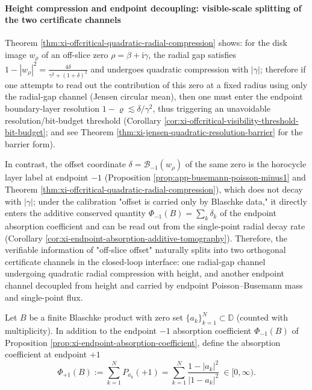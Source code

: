 \paragraph{Height compression and endpoint decoupling: visible-scale splitting of the two certificate channels}
Theorem \ref{thm:xi-offcritical-quadratic-radial-compression} shows: for the disk image \(w_\rho\) of an off-slice zero \(\rho=\beta+\mathrm{i}\gamma\), the radial gap satisfies
\(
1-|w_\rho|^2=\frac{4\delta}{\gamma^2+(1+\delta)^2}
\)
and undergoes quadratic compression with \(|\gamma|\);
therefore if one attempts to read out the contribution of this zero at a fixed radius using only the radial-gap channel (Jensen circular mean), then one must enter the endpoint boundary-layer resolution \(1-\varrho\lesssim \delta/\gamma^2\), thus triggering an unavoidable resolution/bit-budget threshold (Corollary \ref{cor:xi-offcritical-visibility-threshold-bit-budget}; and see Theorem \ref{thm:xi-jensen-quadratic-resolution-barrier} for the barrier form).
\par
In contrast, the offset coordinate \(\delta=\mathcal{B}_{-1}(w_\rho)\) of the same zero is the horocycle layer label at endpoint \(-1\) (Proposition \ref{prop:app-busemann-poisson-minus1} and Theorem \ref{thm:xi-offcritical-quadratic-radial-compression}), which does not decay with \(|\gamma|\);
under the calibration "offset is carried only by Blaschke data," it directly enters the additive conserved quantity \(\Phi_{-1}(B)=\sum_k \delta_k\) of the endpoint absorption coefficient and can be read out from the single-point radial decay rate (Corollary \ref{cor:xi-endpoint-absorption-additive-tomography}).
Therefore, the verifiable information of "off-slice offset" naturally splits into two orthogonal certificate channels in the closed-loop interface: one radial-gap channel undergoing quadratic radial compression with height, and another endpoint channel decoupled from height and carried by endpoint Poisson--Busemann mass and single-point flux.

\begin{definition}\label{def:xi-endpoint-two-absorption-coefficients}
Let \(B\) be a finite Blaschke product with zero set \(\{a_k\}_{k=1}^{N}\subset\mathbb{D}\) (counted with multiplicity).
In addition to the endpoint \(-1\) absorption coefficient \(\Phi_{-1}(B)\) of Proposition \ref{prop:xi-endpoint-absorption-coefficient}, define the absorption coefficient at endpoint \(+1\)
\[
\Phi_{+1}(B):=\sum_{k=1}^{N}P_{a_k}(+1)=\sum_{k=1}^{N}\frac{1-|a_k|^2}{|1-a_k|^2}\ \in[0,\infty).
\]
\end{definition}

